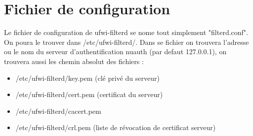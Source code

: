 \documentclass[12pt]{report}
\begin{document}
\section{Fichier de configuration}
Le fichier de configuration de ufwi-filterd se nome tout simplement "filterd.conf". On poura le trouver dans /etc/ufwi-filterd/.
Dans se fichier on trouvera l'adresse ou le nom du serveur d'authentification nuauth (par defaut 127.0.0.1), on trouvera aussi les chemin absolut des fichiers :
\begin{itemize}
  \item /etc/ufwi-filterd/key.pem (clé privé du serveur)
  \item /etc/ufwi-filterd/cert.pem (certificat du serveur)
  \item /etc/ufwi-filterd/cacert.pem
  \item /etc/ufwi-filterd/crl.pem (liste de révocation de certificat serveur)
\end{itemize}

\end{document}
